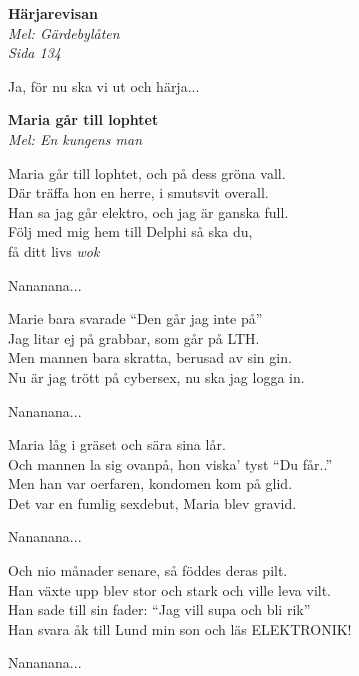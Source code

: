 \documentclass[10pt]{article}
\newenvironment{song}[2]{
	\textbf{#1}\\
	\emph{#2}\par
	\vspace{-1mm}
}{
	\vspace{2mm}
}
\begin{document}
\begin{multicols*}{2}
\begin{song}{Härjarevisan}{Mel: Gärdebylåten\\Sida 134}
	Ja, för nu ska vi ut och härja...
\end{song}

\vfill
\columnbreak

\begin{song}{Maria går till lophtet}{Mel: En kungens man}
Maria går till lophtet, och på dess gröna vall.\\
Där träffa hon en herre, i smutsvit overall.\\
Han sa jag går elektro, och jag är ganska full.\\
Följ med mig hem till Delphi så ska du,\\
få ditt livs \emph{wok}

Nananana...

Marie bara svarade ``Den går jag inte på''\\
Jag litar ej på grabbar, som går på LTH.\\
Men mannen bara skratta, berusad av sin gin.\\
Nu är jag trött på cybersex, nu ska jag logga in.

Nananana...

Maria låg i gräset och sära sina lår.\\
Och mannen la sig ovanpå, hon viska' tyst ``Du får..''\\
Men han var oerfaren, kondomen kom på glid.\\
Det var en fumlig sexdebut, Maria blev gravid.

Nananana...

Och nio månader senare, så föddes deras pilt.\\
Han växte upp blev stor och stark och ville leva vilt.\\
Han sade till sin fader: ``Jag vill supa och bli rik''\\
Han svara åk till Lund min son och läs ELEKTRONIK!

Nananana...
\end{song}

\end{multicols*}
\end{document}
